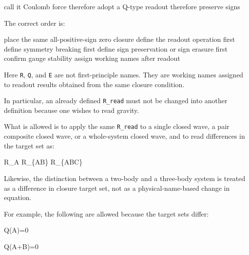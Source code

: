\documentclass[
  a4paper,
]{article}
\newenvironment{Shaded}{}{}
\newcommand{\NormalTok}[1]{#1}
\begin{document}
\begin{Shaded}
\begin{Highlighting}[]
\NormalTok{call it Coulomb force}
\NormalTok{therefore adopt a Q{-}type readout}
\NormalTok{therefore preserve signs}
\end{Highlighting}
\end{Shaded}

The correct order is:

\begin{Shaded}
\begin{Highlighting}[]
\NormalTok{place the same all{-}positive{-}sign zero closure}
\NormalTok{define the readout operation first}
\NormalTok{define symmetry breaking first}
\NormalTok{define sign preservation or sign erasure first}
\NormalTok{confirm gauge stability}
\NormalTok{assign working names after readout}
\end{Highlighting}
\end{Shaded}

Here \texttt{R}, \texttt{Q}, and \texttt{E} are not first-principle
names. They are working names assigned to readout results obtained from
the same closure condition.

In particular, an already defined \texttt{R\_read} must not be changed
into another definition because one wishes to read gravity.

What is allowed is to apply the same \texttt{R\_read} to a single closed
wave, a pair composite closed wave, or a whole-system closed wave, and
to read differences in the target set as:

\begin{Shaded}
\begin{Highlighting}[]
\NormalTok{R\_A}
\NormalTok{R\_\{AB\}}
\NormalTok{R\_\{ABC\}}
\end{Highlighting}
\end{Shaded}

Likewise, the distinction between a two-body and a three-body system is
treated as a difference in closure target set, not as a
physical-name-based change in equation.

For example, the following are allowed because the target sets differ:

\begin{Shaded}
\begin{Highlighting}[]
\NormalTok{Q(A)=0}
\end{Highlighting}
\end{Shaded}

\begin{Shaded}
\begin{Highlighting}[]
\NormalTok{Q(A+B)=0}
\end{Highlighting}
\end{Shaded}
\end{document}
